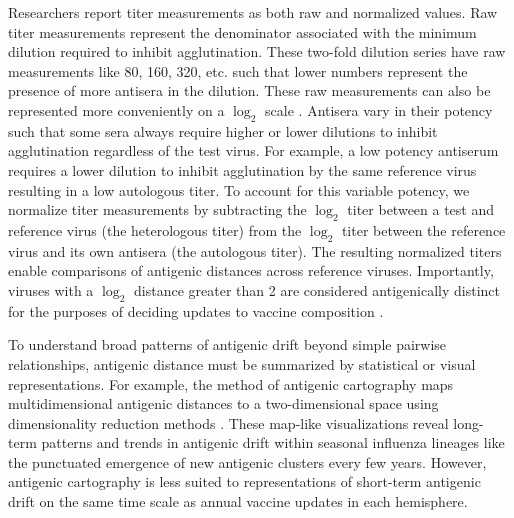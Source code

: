\documentclass[utf8]{FrontiersinHarvard} %
\begin{document}
Researchers report titer measurements as both raw and normalized values.
Raw titer measurements represent the denominator associated with the minimum dilution required to inhibit agglutination.
These two-fold dilution series have raw measurements like 80, 160, 320, etc. such that lower numbers represent the presence of more antisera in the dilution.
These raw measurements can also be represented more conveniently on a $\log_{2}$ scale \citep{Smith:2004jc,Bedford:2014bf}.
Antisera vary in their potency such that some sera always require higher or lower dilutions to inhibit agglutination regardless of the test virus.
For example, a low potency antiserum requires a lower dilution to inhibit agglutination by the same reference virus resulting in a low autologous titer.
To account for this variable potency, we normalize titer measurements by subtracting the $\log_{2}$ titer between a test and reference virus (the heterologous titer) from the $\log_{2}$ titer between the reference virus and its own antisera (the autologous titer).
The resulting normalized titers enable comparisons of antigenic distances across reference viruses.
Importantly, viruses with a $\log_{2}$ distance greater than 2 are considered antigenically distinct for the purposes of deciding updates to vaccine composition \citep{Katz2011}.

To understand broad patterns of antigenic drift beyond simple pairwise relationships, antigenic distance must be summarized by statistical or visual representations.
For example, the method of antigenic cartography maps multidimensional antigenic distances to a two-dimensional space using dimensionality reduction methods \citep{Smith:2004jc,Bedford:2014bf}.
These map-like visualizations reveal long-term patterns and trends in antigenic drift within seasonal influenza lineages like the punctuated emergence of new antigenic clusters every few years.
However, antigenic cartography is less suited to representations of short-term antigenic drift on the same time scale as annual vaccine updates in each hemisphere.
\end{document}
